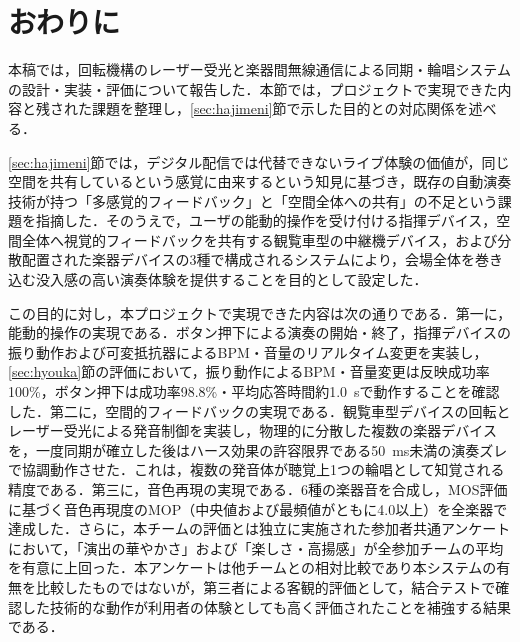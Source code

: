 \section{おわりに}
\label{sec:owarini}

本稿では，回転機構のレーザー受光と楽器間無線通信による同期・輪唱システムの設計・実装・評価について報告した．本節では，プロジェクトで実現できた内容と残された課題を整理し，\ref{sec:hajimeni}節で示した目的との対応関係を述べる．

\ref{sec:hajimeni}節では，デジタル配信では代替できないライブ体験の価値が，同じ空間を共有しているという感覚に由来するという知見に基づき，既存の自動演奏技術が持つ「多感覚的フィードバック」と「空間全体への共有」の不足という課題を指摘した．そのうえで，ユーザの能動的操作を受け付ける指揮デバイス，空間全体へ視覚的フィードバックを共有する観覧車型の中継機デバイス，および分散配置された楽器デバイスの3種で構成されるシステムにより，会場全体を巻き込む没入感の高い演奏体験を提供することを目的として設定した．

この目的に対し，本プロジェクトで実現できた内容は次の通りである．第一に，能動的操作の実現である．ボタン押下による演奏の開始・終了，指揮デバイスの振り動作および可変抵抗器によるBPM・音量のリアルタイム変更を実装し，\ref{sec:hyouka}節の評価において，振り動作によるBPM・音量変更は反映成功率100\%，ボタン押下は成功率98.8\%・平均応答時間約\SI{1.0}{s}で動作することを確認した．第二に，空間的フィードバックの実現である．観覧車型デバイスの回転とレーザー受光による発音制御を実装し，物理的に分散した複数の楽器デバイスを，一度同期が確立した後はハース効果の許容限界である\SI{50}{ms}未満の演奏ズレで協調動作させた．これは，複数の発音体が聴覚上1つの輪唱として知覚される精度である．第三に，音色再現の実現である．6種の楽器音を合成し，MOS評価に基づく音色再現度のMOP（中央値および最頻値がともに4.0以上）を全楽器で達成した．さらに，本チームの評価とは独立に実施された参加者共通アンケートにおいて，「演出の華やかさ」および「楽しさ・高揚感」が全参加チームの平均を有意に上回った．本アンケートは他チームとの相対比較であり本システムの有無を比較したものではないが，第三者による客観的評価として，結合テストで確認した技術的な動作が利用者の体験としても高く評価されたことを補強する結果である．

